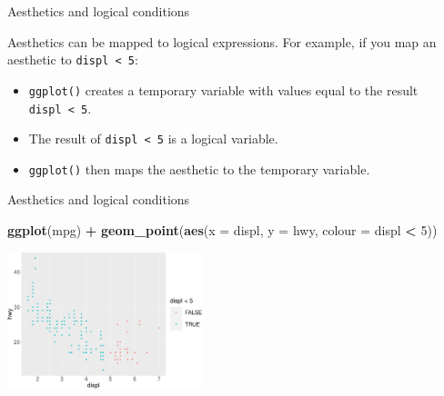 \documentclass[ignorenonframetext,]{beamer}
\newenvironment{Shaded}{\begin{snugshade}}{\end{snugshade}}
\newcommand{\DataTypeTok}[1]{\textcolor[rgb]{0.13,0.29,0.53}{#1}}
\newcommand{\DecValTok}[1]{\textcolor[rgb]{0.00,0.00,0.81}{#1}}
\newcommand{\KeywordTok}[1]{\textcolor[rgb]{0.13,0.29,0.53}{\textbf{#1}}}
\newcommand{\NormalTok}[1]{#1}
\newcommand{\OperatorTok}[1]{\textcolor[rgb]{0.81,0.36,0.00}{\textbf{#1}}}
\newcommand{\StringTok}[1]{\textcolor[rgb]{0.31,0.60,0.02}{#1}}
\begin{document}
\begin{frame}[fragile]{Aesthetics and logical conditions}
\protect\hypertarget{aesthetics-and-logical-conditions}{}

Aesthetics can be mapped to logical expressions. For example, if you map
an aesthetic to \texttt{displ\ \textless{}\ 5}:

\begin{itemize}
\item
  \texttt{ggplot()} creates a temporary variable with values equal to
  the result \texttt{displ\ \textless{}\ 5}.
\item
  The result of \texttt{displ\ \textless{}\ 5} is a logical variable.
\item
  \texttt{ggplot()} then maps the aesthetic to the temporary variable.
\end{itemize}

\end{frame}

\begin{frame}[fragile]{Aesthetics and logical conditions}
\protect\hypertarget{aesthetics-and-logical-conditions-1}{}

\begin{Shaded}
\begin{Highlighting}[]
\KeywordTok{ggplot}\NormalTok{(mpg) }\OperatorTok{+}\StringTok{ }
\StringTok{  }\KeywordTok{geom_point}\NormalTok{(}\KeywordTok{aes}\NormalTok{(}\DataTypeTok{x =}\NormalTok{ displ, }\DataTypeTok{y =}\NormalTok{ hwy, }
                 \DataTypeTok{colour =}\NormalTok{ displ }\OperatorTok{<}\StringTok{ }\DecValTok{5}\NormalTok{))}
\end{Highlighting}
\end{Shaded}

\begin{center}\includegraphics[height=150px]{data-visualization_files/figure-beamer/unnamed-chunk-36-1} \end{center}

\end{frame}
\end{document}
